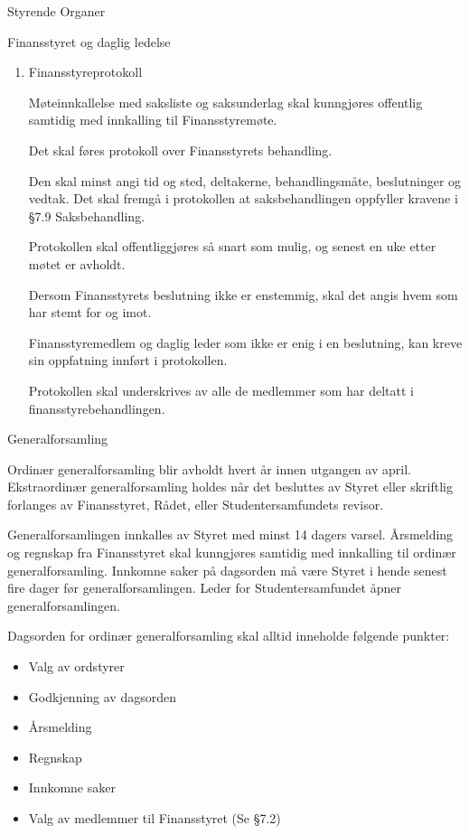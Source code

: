 \documentclass[fsbok.tex]{subfiles}
\begin{document}
\begin{lovkapittel}{Styrende Organer}
\begin{lovparagraf}{Finansstyret og daglig ledelse}
\begin{enumerate}
    \item Finansstyreprotokoll
    
    Møteinnkallelse med saksliste og saksunderlag skal kunngjøres offentlig samtidig med innkalling til
    Finansstyremøte.
    
    Det skal føres protokoll over Finansstyrets behandling.
    
    Den skal minst angi tid og sted, deltakerne, behandlingsmåte, beslutninger og vedtak. Det skal fremgå i
    protokollen at saksbehandlingen oppfyller kravene i §7.9 Saksbehandling.
    
    Protokollen skal offentliggjøres så snart som mulig, og senest en uke etter møtet er avholdt.
    
    Dersom Finansstyrets beslutning ikke er enstemmig, skal det angis hvem som har stemt for og imot.
    
    Finansstyremedlem og daglig leder som ikke er enig i en beslutning, kan kreve sin oppfatning innført i
    protokollen.
    
    Protokollen skal underskrives av alle de medlemmer som har deltatt i finansstyrebehandlingen.

   
    \end{enumerate}
    
   \end{lovparagraf}
   
   \begin{lovparagraf}{Generalforsamling}
   
Ordinær generalforsamling blir avholdt hvert år innen utgangen av april. Ekstraordinær generalforsamling holdes når
det besluttes av Styret eller skriftlig forlanges av Finansstyret, Rådet, eller Studentersamfundets revisor.

Generalforsamlingen innkalles av Styret med minst 14 dagers varsel. Årsmelding og regnskap fra Finansstyret skal
kunngjøres samtidig med innkalling til ordinær generalforsamling. Innkomne saker på dagsorden må være Styret i
hende senest fire dager før generalforsamlingen. Leder for Studentersamfundet åpner generalforsamlingen.

Dagsorden for ordinær generalforsamling skal alltid inneholde følgende punkter:

\begin{itemize}
\item Valg av ordstyrer
\item Godkjenning av dagsorden
\item Årsmelding
\item Regnskap
\item Innkomne saker
\item Valg av medlemmer til Finansstyret (Se §7.2)
\end{itemize}


\end{lovparagraf}
\end{lovkapittel}
\end{document}
